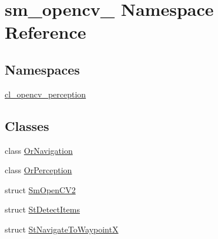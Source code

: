 \hypertarget{namespacesm__opencv__2}{}\section{sm\+\_\+opencv\+\_ Namespace Reference}
\label{namespacesm__opencv__2}
\subsection*{Namespaces}
\begin{DoxyCompactItemize}
\item 
 \hyperlink{namespacesm__opencv__2_1_1cl__opencv__perception}{cl\+\_\+opencv\+\_\+perception}
\end{DoxyCompactItemize}
\subsection*{Classes}
\begin{DoxyCompactItemize}
\item 
class \hyperlink{classsm__opencv__2_1_1OrNavigation}{Or\+Navigation}
\item 
class \hyperlink{classsm__opencv__2_1_1OrPerception}{Or\+Perception}
\item 
struct \hyperlink{structsm__opencv__2_1_1SmOpenCV2}{Sm\+Open\+C\+V2}
\item 
struct \hyperlink{structsm__opencv__2_1_1StDetectItems}{St\+Detect\+Items}
\item 
struct \hyperlink{structsm__opencv__2_1_1StNavigateToWaypointX}{St\+Navigate\+To\+WaypointX}
\end{DoxyCompactItemize}

